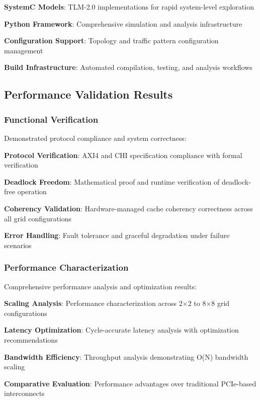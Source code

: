 \documentclass[11pt,a4paper]{article}
\begin{document}
\begin{techlist}
    \item \textbf{SystemC Models}: TLM-2.0 implementations for rapid system-level exploration
    \item \textbf{Python Framework}: Comprehensive simulation and analysis infrastructure
    \item \textbf{Configuration Support}: Topology and traffic pattern configuration management
    \item \textbf{Build Infrastructure}: Automated compilation, testing, and analysis workflows
\end{techlist}

\subsection{Performance Validation Results}

\subsubsection{Functional Verification}
Demonstrated protocol compliance and system correctness:

\begin{techlist}
    \item \textbf{Protocol Verification}: AXI4 and CHI specification compliance with formal verification
    \item \textbf{Deadlock Freedom}: Mathematical proof and runtime verification of deadlock-free operation
    \item \textbf{Coherency Validation}: Hardware-managed cache coherency correctness across all grid configurations
    \item \textbf{Error Handling}: Fault tolerance and graceful degradation under failure scenarios
\end{techlist}

\subsubsection{Performance Characterization}
Comprehensive performance analysis and optimization results:

\begin{techlist}
    \item \textbf{Scaling Analysis}: Performance characterization across 2×2 to 8×8 grid configurations
    \item \textbf{Latency Optimization}: Cycle-accurate latency analysis with optimization recommendations
    \item \textbf{Bandwidth Efficiency}: Throughput analysis demonstrating O(N) bandwidth scaling
    \item \textbf{Comparative Evaluation}: Performance advantages over traditional PCIe-based interconnects
\end{techlist}
\end{document}
